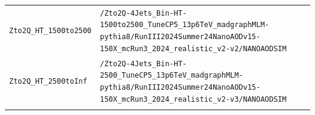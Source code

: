 \begin{longtable}{@{}>{\RaggedRight\arraybackslash}p{} >{\RaggedRight\arraybackslash}p{}@{}}
\addlinespace[2pt]
\texttt{Zto2Q\_\allowbreak{}HT\_\allowbreak{}1500to2500} & \texttt{/\allowbreak{}Zto2Q-\allowbreak{}4Jets\_\allowbreak{}Bin-\allowbreak{}HT-\allowbreak{}1500to2500\_\allowbreak{}TuneCP5\_\allowbreak{}13p6TeV\_\allowbreak{}madgraphMLM-\allowbreak{}pythia8/\allowbreak{}RunIII2024Summer24NanoAODv15-\allowbreak{}150X\_\allowbreak{}mcRun3\_\allowbreak{}2024\_\allowbreak{}realistic\_\allowbreak{}v2-\allowbreak{}v2/\allowbreak{}NANOAODSIM} \\
\addlinespace[2pt]
\texttt{Zto2Q\_\allowbreak{}HT\_\allowbreak{}2500toInf} & \texttt{/\allowbreak{}Zto2Q-\allowbreak{}4Jets\_\allowbreak{}Bin-\allowbreak{}HT-\allowbreak{}2500\_\allowbreak{}TuneCP5\_\allowbreak{}13p6TeV\_\allowbreak{}madgraphMLM-\allowbreak{}pythia8/\allowbreak{}RunIII2024Summer24NanoAODv15-\allowbreak{}150X\_\allowbreak{}mcRun3\_\allowbreak{}2024\_\allowbreak{}realistic\_\allowbreak{}v2-\allowbreak{}v3/\allowbreak{}NANOAODSIM} \\
\addlinespace[2pt]
\end{longtable}
